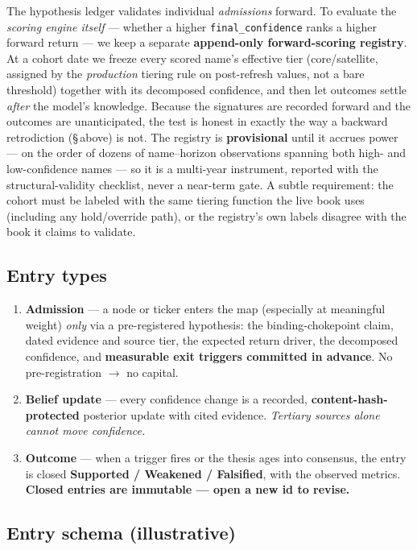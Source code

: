 \documentclass[11pt]{article}
\begin{document}
The hypothesis ledger validates individual \emph{admissions} forward. To evaluate the \emph{scoring
engine itself} --- whether a higher \texttt{final\_confidence} ranks a higher forward return --- we
keep a separate \textbf{append-only forward-scoring registry}. At a cohort date we freeze every scored
name's effective tier (core/satellite, assigned by the \emph{production} tiering rule on post-refresh
values, not a bare threshold) together with its decomposed confidence, and then let outcomes settle
\emph{after} the model's knowledge. Because the signatures are recorded forward and the outcomes are
unanticipated, the test is honest in exactly the way a backward retrodiction (\S\,above) is not. The
registry is \textbf{provisional} until it accrues power --- on the order of dozens of
name--horizon observations spanning both high- and low-confidence names --- so it is a multi-year
instrument, reported with the structural-validity checklist, never a near-term gate. A subtle
requirement: the cohort must be labeled with the same tiering function the live book uses (including
any hold/override path), or the registry's own labels disagree with the book it claims to validate.

\subsection*{Entry types}

\begin{enumerate}
  \item \textbf{Admission} --- a node or ticker enters the map (especially at meaningful weight)
    \emph{only} via a pre-registered hypothesis: the binding-chokepoint claim, dated evidence and
    source tier, the expected return driver, the decomposed confidence, and \textbf{measurable exit
    triggers committed in advance}. No pre-registration $\rightarrow$ no capital.
  \item \textbf{Belief update} --- every confidence change is a recorded,
    \textbf{content-hash-protected} posterior update with cited evidence. \emph{Tertiary sources
    alone cannot move confidence.}
  \item \textbf{Outcome} --- when a trigger fires or the thesis ages into consensus, the entry is
    closed \textbf{Supported / Weakened / Falsified}, with the observed metrics. \textbf{Closed
    entries are immutable --- open a new id to revise.}
\end{enumerate}

\subsection*{Entry schema (illustrative)}
\end{document}
